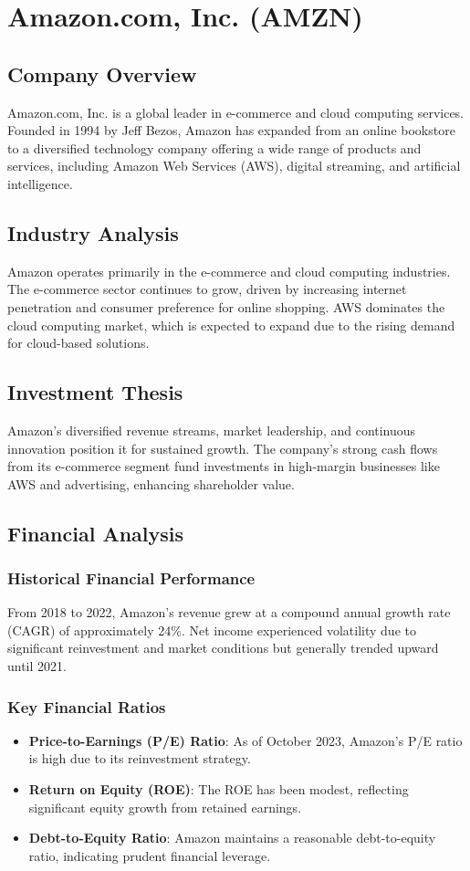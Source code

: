 \documentclass[12pt]{report}
\begin{document}
\chapter{Amazon.com, Inc. (AMZN)}
\section{Company Overview}
Amazon.com, Inc. is a global leader in e-commerce and cloud computing services. Founded in 1994 by Jeff Bezos, Amazon has expanded from an online bookstore to a diversified technology company offering a wide range of products and services, including Amazon Web Services (AWS), digital streaming, and artificial intelligence.

\section{Industry Analysis}
Amazon operates primarily in the e-commerce and cloud computing industries. The e-commerce sector continues to grow, driven by increasing internet penetration and consumer preference for online shopping. AWS dominates the cloud computing market, which is expected to expand due to the rising demand for cloud-based solutions.

\section{Investment Thesis}
Amazon's diversified revenue streams, market leadership, and continuous innovation position it for sustained growth. The company's strong cash flows from its e-commerce segment fund investments in high-margin businesses like AWS and advertising, enhancing shareholder value.

\section{Financial Analysis}
\subsection{Historical Financial Performance}
From 2018 to 2022, Amazon's revenue grew at a compound annual growth rate (CAGR) of approximately 24\%. Net income experienced volatility due to significant reinvestment and market conditions but generally trended upward until 2021.

\subsection{Key Financial Ratios}
\begin{itemize}
    \item \textbf{Price-to-Earnings (P/E) Ratio}: As of October 2023, Amazon's P/E ratio is high due to its reinvestment strategy.
    \item \textbf{Return on Equity (ROE)}: The ROE has been modest, reflecting significant equity growth from retained earnings.
    \item \textbf{Debt-to-Equity Ratio}: Amazon maintains a reasonable debt-to-equity ratio, indicating prudent financial leverage.
\end{itemize}
\end{document}
